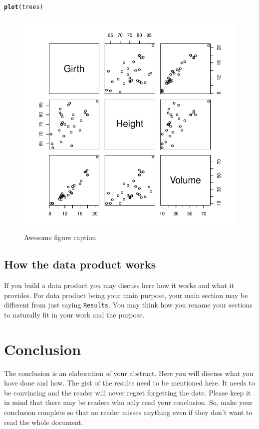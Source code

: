 \documentclass{article}\usepackage[]{graphicx}\usepackage[]{color}
\makeatletter
\newcommand{\hlstd}[1]{\textcolor[rgb]{0.345,0.345,0.345}{#1}}%
\newcommand{\hlkwd}[1]{\textcolor[rgb]{0.737,0.353,0.396}{\textbf{#1}}}%
\newenvironment{kframe}{%
 \def\at@end@of@kframe{}%
 \ifinner\ifhmode%
  \def\at@end@of@kframe{\end{minipage}}%
  \begin{minipage}{\columnwidth}%
 \fi\fi%
 \def\FrameCommand##1{\hskip\@totalleftmargin \hskip-\fboxsep
 \colorbox{shadecolor}{##1}\hskip-\fboxsep
     \hskip-\linewidth \hskip-\@totalleftmargin \hskip\columnwidth}%
 \MakeFramed {\advance\hsize-\width
   \@totalleftmargin\z@ \linewidth\hsize
   \@setminipage}}%
 {\par\unskip\endMakeFramed%
 \at@end@of@kframe}
\newenvironment{knitrout}{}{} %
\makeatother
\begin{document}
\begin{knitrout}
\color{fgcolor}\begin{kframe}
\begin{alltt}
\hlkwd{plot}\hlstd{(trees)}
\end{alltt}
\end{kframe}\begin{figure}[hbtp]

{\centering \includegraphics[width=.6\linewidth]{figure/data-plot-1} 

}

\caption[Awesome figure caption]{Awesome figure caption}\label{fig:data-plot}
\end{figure}


\end{knitrout}

\subsection{How the data product works} If you build a data product you may discuss here how it works and what it provides. For data product being your main purpose, your main section may be different from just saying \texttt{Results}. You may think how you rename your sections to naturally fit in your work and the purpose.

\section{Conclusion} The conclusion is an elaboration of your abstract. Here you will discuss what you have done and how. The gist of the results need to be mentioned here. It needs to be convincing and the reader will never regret forgetting the date. Please keep it in mind that there may be readers who only read your conclusion. So, make your conclusion complete so that no reader misses anything even if they don't want to read the whole document.\\
\end{document}
